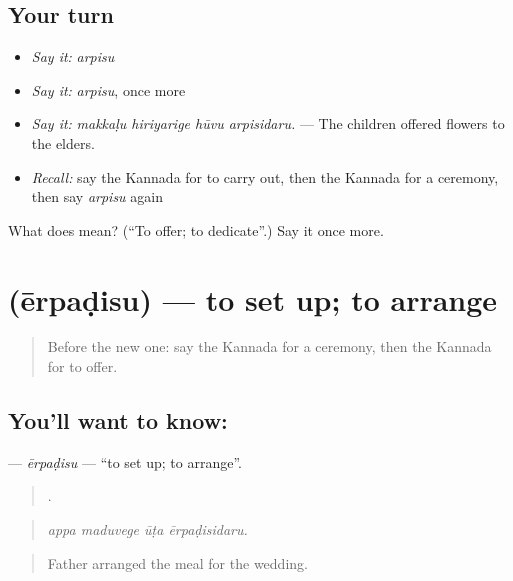 \subsection*{Your turn}
\begin{itemize}
\raggedright
  \item \emph{Say it:} \emph{arpisu}
  \item \emph{Say it:} \emph{arpisu}, once more
  \item \emph{Say it:} \emph{makkaḷu hiriyarige hūvu arpisidaru.} — The children offered flowers to the elders.
  \item \emph{Recall:} say the Kannada for to carry out, then the Kannada for a ceremony, then say \emph{arpisu} again
\end{itemize}

\begin{tcolorbox}[breakable,colback=teal!4,colframe=teal!35!black,title={Before you move on}]
What does  mean? (\textquotedblleft{}To offer; to dedicate\textquotedblright{}.) Say it once more.
\end{tcolorbox}
\section[\texorpdfstring{\kn{ಏರ್ಪಡಿಸು} (ērpaḍisu)}{ಏರ್ಪಡಿಸು (ērpaḍisu)}]{ (ērpaḍisu) — to set up; to arrange}

\label{lesson:KA-C333-erpadisu}



\begin{quote}
Before the new one: say the Kannada for a ceremony, then the Kannada for to offer.
\end{quote}

\subsection*{You'll want to know: }
\textbf{} — \emph{ērpaḍisu} — \textquotedblleft{}to set up; to arrange\textquotedblright{}.

\begin{quote}
   .
\end{quote}

\begin{quote}
\emph{appa maduvege ūṭa ērpaḍisidaru.}
\end{quote}

\begin{quote}
Father arranged the meal for the wedding.
\end{quote}

